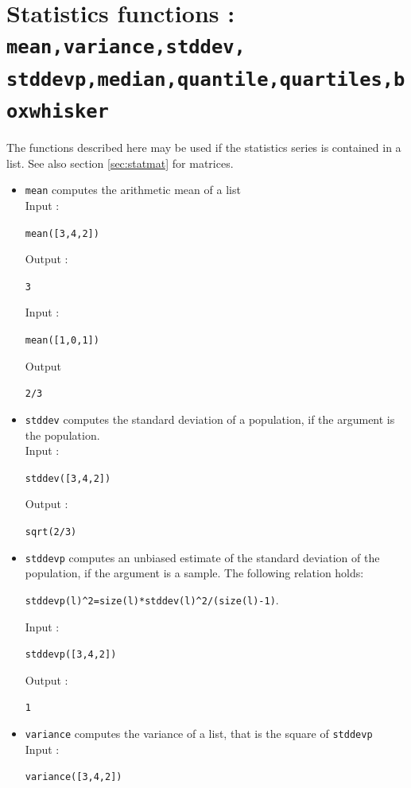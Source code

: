 \documentclass[a4paper,11pt]{book}
\begin{document}
\section{Statistics functions : {\tt mean,variance,stddev, stddevp,median,quantile,quartiles,boxwhisker}} \label{sec:statlist}
The functions described here may be used if the statistics series 
is contained in a list. See also section \ref{sec:statmat} for matrices.
\begin{itemize}
\item{\tt mean} computes the arithmetic mean of a list\\
Input :
\begin{center}{\tt mean([3,4,2])}\end{center}
Output :
\begin{center}{\tt  3}\end{center}
Input :
\begin{center}{\tt mean([1,0,1])}\end{center}
Output 
\begin{center}{\tt  2/3}\end{center}
\item{\tt stddev} computes the standard deviation of a population,
if the argument is the population.\\
Input :
\begin{center}{\tt stddev([3,4,2])}\end{center}
Output :
\begin{center}{\tt sqrt(2/3)}\end{center}
\item{\tt stddevp} computes an unbiased estimate of
the standard deviation of the population,
if the argument is a sample. The following
relation holds:
\begin{center}
 {\tt stddevp(l)\verb|^|2=size(l)*stddev(l)\verb|^|2/(size(l)-1)}.
\end{center}
Input :
\begin{center}{\tt stddevp([3,4,2])}\end{center}
Output :
\begin{center}{\tt 1}\end{center}
\item{\tt variance} computes the variance of a list, that is
the square of {\tt stddevp}\\
Input :
\begin{center}{\tt variance([3,4,2])}\end{center}

\end{itemize}
\end{document}
